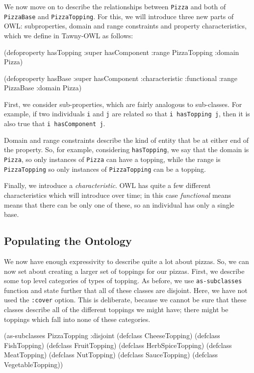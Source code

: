 \documentclass[11pt]{article}
\begin{document}
We now move on to describe the relationships between \verb~Pizza~ and both of
\verb~PizzaBase~ and \verb~PizzaTopping~. For this, we will introduce three new parts of
OWL: subproperties, domain and range constraints and property characteristics,
which we define in Tawny-OWL as follows:

\begin{tawny}
(defoproperty hasTopping
  :super hasComponent
  :range PizzaTopping
  :domain Pizza)

(defoproperty hasBase
  :super hasComponent
  :characteristic :functional
  :range PizzaBase
  :domain Pizza)
\end{tawny}


First, we consider sub-properties, which are fairly analogous to sub-classes.
For example, if two individuals \verb~i~ and \verb~j~ are related so that \verb~i hasTopping j~, then it is also true that \verb~i hasComponent j~.

Domain and range constraints describe the kind of entity that be at either end
of the property. So, for example, considering \verb~hasTopping~, we say that the
domain is \verb~Pizza~, so only instances of \verb~Pizza~ can have a topping, while the
range is \verb~PizzaTopping~ so only instances of \verb~PizzaTopping~ can be a topping. 

Finally, we introduce a \emph{characteristic}. OWL has quite a few different
characteristics which will introduce over time; in this case \emph{functional}
means means that there can be only one of these, so an individual has only a
single base.


\subsection{Populating the Ontology}
\label{sec-5-4}

We now have enough expressivity to describe quite a lot about pizzas. So, we
can now set about creating a larger set of toppings for our pizzas. First, we
describe some top level categories of types of topping. As before, we use
\verb~as-subclasses~ function and state further that all of these classes are
disjoint. Here, we have not used the \verb~:cover~ option. This is deliberate,
because we cannot be sure that these classes describe all of the different
toppings we might have; there might be toppings which fall into none of these
categories. 

\begin{tawny}
(as-subclasses
 PizzaTopping
 :disjoint
 (defclass CheeseTopping)
 (defclass FishTopping)
 (defclass FruitTopping)
 (defclass HerbSpiceTopping)
 (defclass MeatTopping)
 (defclass NutTopping)
 (defclass SauceTopping)
 (defclass VegetableTopping))
\end{tawny}
\end{document}
